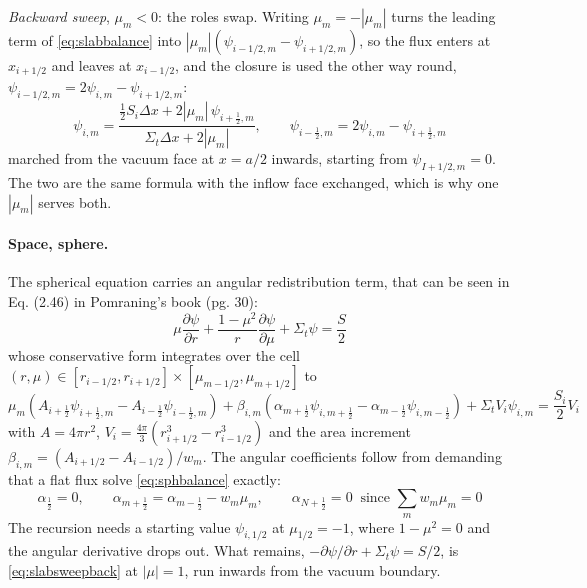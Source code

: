 \documentclass[11pt]{article}
\begin{document}
\emph{Backward sweep}, $\mu_m<0$: the roles swap. Writing $\mu_m=-|\mu_m|$ turns
the leading term of \eqref{eq:slabbalance} into
$|\mu_m|(\psi_{i-1/2,m}-\psi_{i+1/2,m})$, so the flux enters at $x_{i+1/2}$ and leaves at
$x_{i-1/2}$, and the closure is used the other way round,
$\psi_{i-1/2,m}=2\psi_{i,m}-\psi_{i+1/2,m}$:
\begin{equation}
    \psi_{i,m} = \frac{\tfrac12 S_i \Delta x + 2|\mu_m|\,\psi_{i+\frac12,m}}
                      {\Sigma_t \Delta x + 2|\mu_m|},
    \qquad
    \psi_{i-\frac12,m} = 2\psi_{i,m} - \psi_{i+\frac12,m}
    \label{eq:slabsweepback}
\end{equation}
marched from the vacuum face at $x=a/2$ inwards, starting from
$\psi_{I+1/2,m}=0$. The two are the same formula with the inflow face exchanged, which is why
one $|\mu_m|$ serves both.

\paragraph{Space, sphere.} The spherical equation carries an angular redistribution term, that can be seen in Eq. (2.46) in Pomraning's book (pg. 30):
\begin{equation}
    \mu \frac{\partial \psi}{\partial r} + \frac{1-\mu^2}{r}\frac{\partial \psi}{\partial \mu} + \Sigma_t \psi = \frac{S}{2}
\end{equation}
whose conservative form integrates over the cell $(r,\mu)\in[r_{i-1/2}, r_{i+1/2}]\times[\mu_{m-1/2}, \mu_{m+1/2}]$ to
\begin{equation}
    \mu_m\left(A_{i+\frac12}\psi_{i+\frac12,m} - A_{i-\frac12}\psi_{i-\frac12,m}\right)
    + \beta_{i,m}\left(\alpha_{m+\frac12}\psi_{i,m+\frac12} - \alpha_{m-\frac12}\psi_{i,m-\frac12}\right)
    + \Sigma_t V_i \psi_{i,m} = \frac{S_i}{2}V_i
    \label{eq:sphbalance}
\end{equation}
with $A = 4\pi r^2$, $V_i = \tfrac{4\pi}{3}(r_{i+1/2}^3 - r_{i-1/2}^3)$ and the area increment
$\beta_{i,m} = \left(A_{i+1/2}-A_{i-1/2}\right)/w_m$. The angular coefficients follow from demanding that a flat flux solve \eqref{eq:sphbalance} exactly:
\begin{equation}
    \alpha_{\frac12} = 0, \qquad \alpha_{m+\frac12} = \alpha_{m-\frac12} - w_m \mu_m,
    \qquad \alpha_{N+\frac12} = 0 \ \text{ since } \sum_m w_m \mu_m = 0
\end{equation}
The recursion needs a starting value $\psi_{i,1/2}$ at $\mu_{1/2}=-1$, where $1-\mu^2=0$ and the angular derivative drops out. What remains, $-\partial \psi/\partial r + \Sigma_t \psi = S/2$, is \eqref{eq:slabsweepback} at $|\mu|=1$, run inwards from the vacuum boundary.
\end{document}
